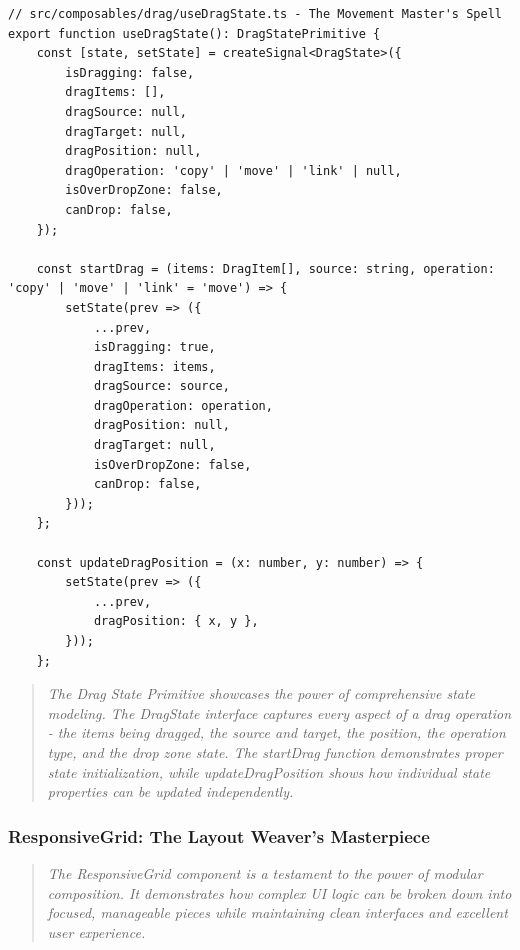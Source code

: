 \documentclass[11pt]{article}
\begin{document}
\begin{lstlisting}[style=typescript]
// src/composables/drag/useDragState.ts - The Movement Master's Spell
export function useDragState(): DragStatePrimitive {
    const [state, setState] = createSignal<DragState>({
        isDragging: false,
        dragItems: [],
        dragSource: null,
        dragTarget: null,
        dragPosition: null,
        dragOperation: 'copy' | 'move' | 'link' | null,
        isOverDropZone: false,
        canDrop: false,
    });

    const startDrag = (items: DragItem[], source: string, operation: 'copy' | 'move' | 'link' = 'move') => {
        setState(prev => ({
            ...prev,
            isDragging: true,
            dragItems: items,
            dragSource: source,
            dragOperation: operation,
            dragPosition: null,
            dragTarget: null,
            isOverDropZone: false,
            canDrop: false,
        }));
    };

    const updateDragPosition = (x: number, y: number) => {
        setState(prev => ({
            ...prev,
            dragPosition: { x, y },
        }));
    };
\end{lstlisting}

\begin{quote}
\emph{The Drag State Primitive showcases the power of comprehensive state modeling. The DragState interface captures every aspect of a drag operation - the items being dragged, the source and target, the position, the operation type, and the drop zone state. The startDrag function demonstrates proper state initialization, while updateDragPosition shows how individual state properties can be updated independently.}
\end{quote}

\subsubsection{ResponsiveGrid: The Layout Weaver's Masterpiece}

\begin{quote}
\emph{The ResponsiveGrid component is a testament to the power of modular composition. It demonstrates how complex UI logic can be broken down into focused, manageable pieces while maintaining clean interfaces and excellent user experience.}
\end{quote}
\end{document}
